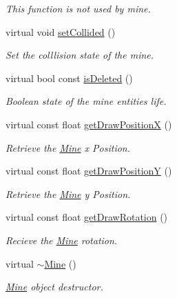 \begin{DoxyCompactItemize}
\begin{DoxyCompactList}\small\item\em This function is not used by mine. \end{DoxyCompactList}\item 
virtual void \hyperlink{classMine_a3a51fbecfcb177529bee4b7e13dd75e2}{set\-Collided} ()
\begin{DoxyCompactList}\small\item\em Set the colllision state of the mine. \end{DoxyCompactList}\item 
virtual bool const \hyperlink{classMine_aa19d1827e837944d74fe02ad0fbeffc9}{is\-Deleted} ()
\begin{DoxyCompactList}\small\item\em Boolean state of the mine entities life. \end{DoxyCompactList}\item 
virtual const float \hyperlink{classMine_a904342dcd8d13f8489c91ed6ba09ec7b}{get\-Draw\-Position\-X} ()
\begin{DoxyCompactList}\small\item\em Retrieve the \hyperlink{classMine}{Mine} x Position. \end{DoxyCompactList}\item 
virtual const float \hyperlink{classMine_a8abe866b857f781f81b0b3b4e9ef7034}{get\-Draw\-Position\-Y} ()
\begin{DoxyCompactList}\small\item\em Retrieve the \hyperlink{classMine}{Mine} y Position. \end{DoxyCompactList}\item 
virtual const float \hyperlink{classMine_a5b6986a3a3ce5177879359a626cc994b}{get\-Draw\-Rotation} ()
\begin{DoxyCompactList}\small\item\em Recieve the \hyperlink{classMine}{Mine} rotation. \end{DoxyCompactList}\item 
virtual \hyperlink{classMine_abfde171f93b463d81d5b18f767a3a37c}{$\sim$\-Mine} ()
\begin{DoxyCompactList}\small\item\em \hyperlink{classMine}{Mine} object destructor. \end{DoxyCompactList}\end{DoxyCompactItemize}
